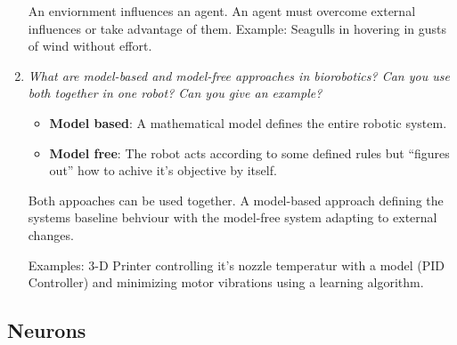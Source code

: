 \documentclass[
    fontsize      = 11pt,
    paper         = a4,
    twoside       = false,
    parskip       = half,
    pagesize      = false,
]{scrartcl}
\providecommand{\tightlist}{%
  \setlength{\itemsep}{0pt}\setlength{\parskip}{0pt}}
\begin{document}
\begin{enumerate}
  An enviornment influences an agent. An agent must overcome external
  influences or take advantage of them. Example: Seagulls in hovering in
  gusts of wind without effort.
\item
  \emph{What are model-based and model-free approaches in biorobotics?
  Can you use both together in one robot? Can you give an example?}

  \begin{itemize}
  \tightlist
  \item
    \textbf{Model based}: A mathematical model defines the entire
    robotic system.
  \item
    \textbf{Model free}: The robot acts according to some defined rules
    but ``figures out'' how to achive it's objective by itself.
  \end{itemize}

  Both appoaches can be used together. A model-based approach defining
  the systems baseline behviour with the model-free system adapting to
  external changes.

  Examples: 3-D Printer controlling it's nozzle temperatur with a model
  (PID Controller) and minimizing motor vibrations using a learning
  algorithm.
\end{enumerate}

\hypertarget{neurons-1}{%
\subsection{Neurons}\label{neurons-1}}
\end{document}
